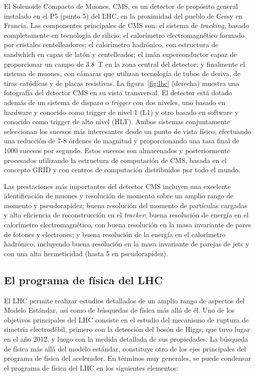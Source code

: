 El Solenoide Compacto de Muones, CMS, es un detector de propósito general instalado en el P5 (punto 5) del LHC, en la proximidad del pueblo de Cessy en Francia. Las componentes principales de CMS son: el sistema de \emph{tracking}, basado completamente en tecnología de silicio;  el calorímetro electromagnético formado por cristales centelleadores; el calorímetro hadrónico, con estructura de sandwhich en capas de latón y centelleador; el imán superconductor capaz de proporcionar un campo de 3.8~T en la zona central del detector; y finalmente el sistema de muones, con cámaras que utilizan tecnología de tubos de deriva, de tiras catódicas y de placas resistivas. La figura~\ref{fig:lhc} (derecha) muestra una fotografía del detector CMS en su vista transversal. El detector está dotado además de un sistema de disparo o \emph{trigger} con dos niveles, uno basado en hardware y conocido como trigger de nivel 1 (L1) y otro basado en software y conocido como trigger de alto nivel (HLT). Ambos sistemas conjuntamente seleccionan los sucesos más interesantes desde un punto de vista físico, efectuando una reducción de 7-8 órdenes de magnitud y proporcionando una tasa final de 1000 sucesos por segundo. Estos sucesos son almacenados y posteriormente procesados utilizando la estructura de computación de CMS, basada en el concepto GRID y con centros de computación distribuidos por todo el mundo. 

Las prestaciones más importantes del detector CMS incluyen una excelente identificación de muones y resolución de momento sobre un amplio rango de momento y pseudorapidez; buena resolución del momento de partículas cargadas y alta eficiencia de reconstrucción en el \emph{tracker}; buena resolución de energía en el calorímetro electromagnético, con buena resolución en la masa invariante de pares de fotones y electrones; y buena resolución de la energía en el calorímetro hadrónico, incluyendo buena resolución en la masa invariante de parejas de jets y con una alta hermeticidad (hasta 5 en pseudorapidez).


\subsection{El programa de física del LHC}

El LHC permite realizar estudios detallados de un amplio rango de aspectos del Modelo Estándar, así como de búsquedas de física más allá de él. Uno de los objetivos principales del LHC consiste en el estudio del mecanismo de ruptura de simetría electrodébil, primero con la detección del bosón de Higgs, que tuvo lugar en el año 2012, y luego con la medida detallada de sus propiedades. La búsqueda de física más allá del modelo estándar, constituye otro de los ejes principales del programa de física del acelerador. En términos muy generales, se puede condensar el programa de física del LHC en los siguientes elementos:

